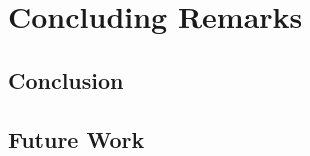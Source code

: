 \chapter{Concluding Remarks}\label{ch:conclusion}

\section{Conclusion}\label{sec:conclusion}

\section{Future Work}\label{sec:futurework}
